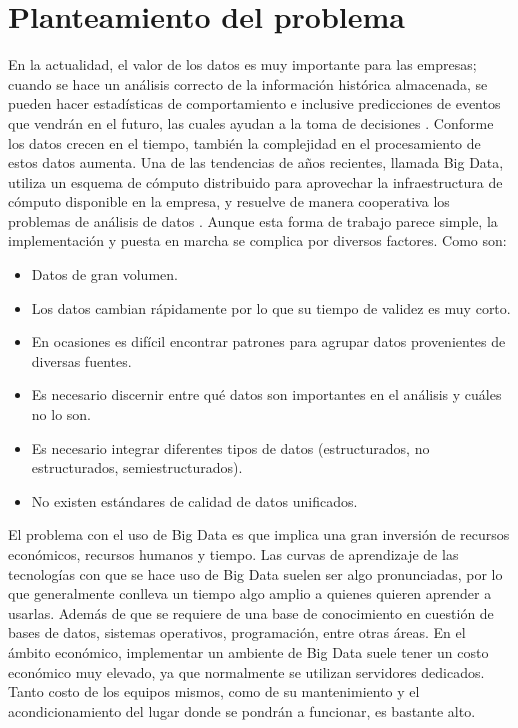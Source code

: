 \section{Planteamiento del problema}
En la actualidad, el valor de los datos es muy importante para las empresas; cuando se hace un análisis correcto de la información histórica almacenada, se pueden hacer estadísticas de comportamiento e inclusive predicciones de eventos que vendrán en el futuro, las cuales ayudan a la toma de decisiones \cite{Baz}. Conforme los datos crecen en el tiempo, también la complejidad en el procesamiento de estos datos aumenta. Una de las tendencias de años recientes, llamada Big Data, utiliza un esquema de cómputo distribuido para aprovechar la infraestructura de cómputo disponible en la empresa, y resuelve de manera cooperativa los problemas de análisis de datos \cite{refi}. Aunque esta forma de trabajo parece simple, la implementación y puesta en marcha se complica por diversos factores.
Como son:\\
\begin{itemize}
\item Datos de gran volumen.\cite{refi2}\\
\item Los datos cambian rápidamente por lo que su tiempo de validez es muy corto.\cite{refi2}\\
\item En ocasiones es difícil encontrar patrones para agrupar datos provenientes de diversas fuentes.\cite{refi2}\\
\item Es necesario discernir entre qué datos son importantes en el análisis y cuáles no lo son.\cite{refi2}\\
\item Es necesario integrar diferentes tipos de datos (estructurados, no estructurados, semiestructurados).\cite{refi2}\\
\item No existen estándares de calidad de datos unificados.\cite{refi2}\\
\end{itemize}
El problema con el uso de Big Data es que implica una gran inversión de recursos económicos, recursos humanos y tiempo. Las curvas de aprendizaje de las tecnologías con que se hace uso de Big Data suelen ser algo pronunciadas, por lo que generalmente conlleva un tiempo algo amplio a quienes quieren aprender a usarlas. Además de que se requiere de una base de conocimiento en cuestión de bases de datos, sistemas operativos, programación, entre otras áreas. En el ámbito económico, implementar un ambiente de Big Data suele tener un costo económico muy elevado, ya que normalmente se utilizan servidores dedicados. Tanto costo de los equipos mismos, como de su mantenimiento y el acondicionamiento del lugar donde se pondrán a funcionar, es bastante alto.\\

